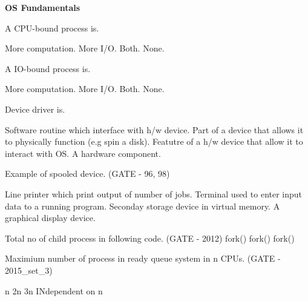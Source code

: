 
\centerline{\textbf{ \LARGE OS Fundamentals}}

\question A CPU-bound process is.

\begin{oneparchoices}
   \choice More computation.
   \choice More I/O.
   \choice Both.
   \choice None.
\end{oneparchoices}


\question A IO-bound process is.

\begin{oneparchoices}
   \choice More computation.
   \choice More I/O.
   \choice Both.
   \choice None.
\end{oneparchoices}


\question Device driver is.

  \begin{choices}
    \choice Software routine which interface with h/w device.
    \choice Part of a device that allows it to physically function (e.g spin a disk).
    \choice Featutre of a h/w device that allow it to interact with OS.
    \choice A hardware component.
  \end{choices}

  \question Example of spooled device. (GATE - 96, 98)

  \begin{choices}
    \choice Line printer which print output of number of jobs.
    \choice Terminal used to enter input data to a running program.
    \choice Seconday storage device in virtual memory.
    \choice A graphical display device.
  \end{choices}

  \question  Total no of child process in following code. (GATE - 2012) \newline
    fork()  \newline fork()  \newline  fork()
  \begin{choices}
  \end{choices}

  \question Maximium number of process in ready queue system in n CPUs. (GATE - 2015\_set\_3)

  \begin{choices}
    \choice n
    \choice 2n
    \choice 3n
    \choice INdependent on n
  \end{choices}

\begin{comment}

  \question  (GATE - )

  \begin{choices}
    \choice
    \choice
    \choice
    \choice
  \end{choices}


\end{comment}
